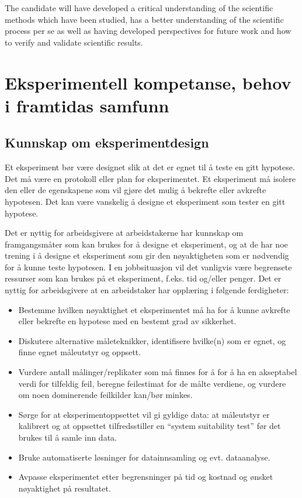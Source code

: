 \documentclass{article}
\begin{document}
\noindent
The candidate will have developed a critical understanding of the scientific methods which have been studied, has a better understanding of the scientific process per se as well as having developed perspectives for future work and how to verify and validate scientific results.



\section{Eksperimentell kompetanse, behov i framtidas samfunn}

\subsection{Kunnskap om eksperimentdesign}
Et eksperiment bør være designet slik at det er egnet til å teste en gitt hypotese.
Det må være en protokoll eller plan for eksperimentet.
Et eksperiment må isolere den eller de egenskapene som vil gjøre det mulig å bekrefte eller avkrefte hypotesen.
Det kan være vanskelig å designe et eksperiment som tester en gitt hypotese.

Det er nyttig for arbeidsgivere at arbeidstakerne har kunnskap om framgangsmåter som kan brukes for å designe et eksperiment, og at de har noe trening i å designe et eksperiment som gir den nøyaktigheten som er nødvendig for å kunne teste hypotesen. I en jobbsituasjon vil det vanligvis være begrensete ressurser som kan brukes på et eksperiment, f.eks. tid og/eller penger.
Det er nyttig for arbeidsgivere at en arbeidstaker har opplæring i følgende ferdigheter:
\begin{itemize}
  \item Bestemme hvilken nøyaktighet et eksperimentet må ha for å kunne avkrefte eller bekrefte en hypotese med en bestemt grad av sikkerhet.
  \item Diskutere alternative måleteknikker, identifisere hvilke(n) som er egnet, og finne egnet måleutstyr og oppsett.
  \item Vurdere antall målinger/replikater som må finnes for å for å ha en akseptabel verdi for tilfeldig feil, beregne feilestimat for de målte verdiene, og vurdere om noen dominerende feilkilder kan/bør minkes.
  \item Sørge for at eksperimentoppsettet vil gi gyldige data: at måleutstyr er kalibrert og at oppsettet tilfredsstiller en ``system suitability test'' før det brukes til å samle inn data.
  \item Bruke automatiserte løsninger for datainnsamling og evt. dataanalyse.
  \item Avpasse eksperimentet etter begrensninger på tid og kostnad og ønsket nøyaktighet på resultatet.
\end{itemize}
\end{document}
